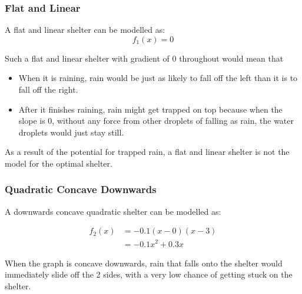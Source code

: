\documentclass[a4paper,titlepage]{article}
\begin{document}
\subsubsection{Flat and Linear}
A flat and linear shelter can be modelled as:
\begin{equation}
    f_1(x)=0
\end{equation}


Such a flat and linear shelter with gradient of 0 throughout would mean that
\begin{itemize}
    \item When it is raining, rain would be just as likely to fall off the left than it is to fall off the right.
    \item After it finishes raining, rain might get trapped on top because when the slope is 0, without any force from other droplets of falling as rain, the water droplets would just stay still.
\end{itemize}

As a result of the potential for trapped rain, a flat and linear shelter is not the model for the optimal shelter.

\subsubsection{Quadratic Concave Downwards}
A downwards concave quadratic shelter can be modelled as:

\begin{align}
    f_2(x)&=-0.1(x-0)(x-3)\\&=-0.1x^2+0.3x
\end{align}


When the graph is concave downwards, rain that falls onto the shelter would immediately slide off the 2 sides, with a very low chance of getting stuck on the shelter.
\end{document}
